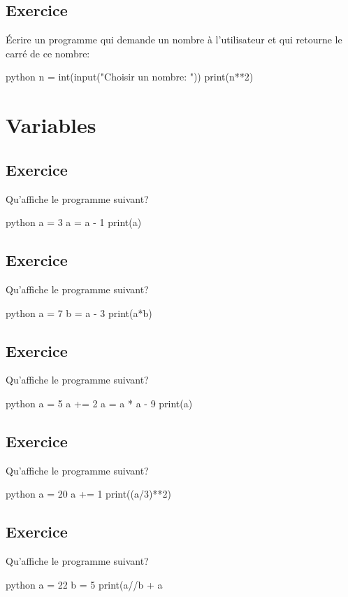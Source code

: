 \documentclass[a4paper,11pt]{article}
\begin{document}
\subsection{Exercice}
Écrire un programme qui demande un nombre à l'utilisateur et qui retourne le carré de ce nombre:\\
\begin{solution}
\begin{code}[interactive]{python}
n = int(input("Choisir un nombre: "))
print(n**2)
\end{code}
\end{solution}

\section{Variables}

\subsection{Exercice}
Qu'affiche le programme suivant?
\begin{code}[interactive]{python}
a = 3
a = a - 1
print(a)
\end{code}

\subsection{Exercice}
Qu'affiche le programme suivant?
\begin{code}[interactive]{python}
a = 7
b = a - 3
print(a*b)
\end{code}

\subsection{Exercice}
Qu'affiche le programme suivant?
\begin{code}[interactive]{python}
a = 5
a += 2
a = a * a - 9
print(a)
\end{code}

\subsection{Exercice}
Qu'affiche le programme suivant?
\begin{code}[interactive]{python}
a = 20
a += 1
print((a/3)**2)
\end{code}

\subsection{Exercice}
Qu'affiche le programme suivant?
\begin{code}[interactive]{python}
a = 22
b = 5
print(a//b + a%
\end{code}
\end{document}

